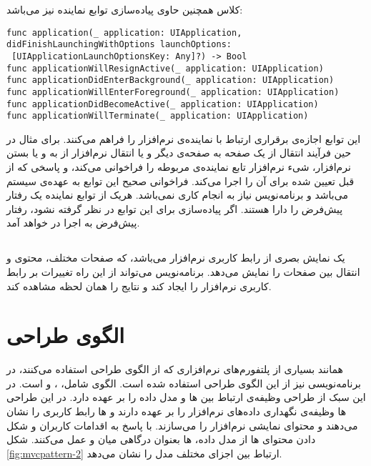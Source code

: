 \documentclass[oneside]{report}
\begin{document}
کلاس
			{\normalsize {}}	
	همچنین حاوی پیاده‌سازی توابع نماینده نیز می‌باشد:
\begin{latin}
	\begin{verbatim}
func application(_ application: UIApplication, 
didFinishLaunchingWithOptions launchOptions:
 [UIApplicationLaunchOptionsKey: Any]?) -> Bool
func applicationWillResignActive(_ application: UIApplication)
func applicationDidEnterBackground(_ application: UIApplication)
func applicationWillEnterForeground(_ application: UIApplication)
func applicationDidBecomeActive(_ application: UIApplication)
func applicationWillTerminate(_ application: UIApplication)
	\end{verbatim}
	
\end{latin}	
این توابع اجازه‌ی برقراری ارتباط با نماینده‌ی نرم‌افزار را فراهم می‌کنند. برای مثال در حین فرآیند انتقال از یک صفحه به صفحه‌ی دیگر و یا انتقال نرم‌افزار از 
			{\normalsize {}}	
			به 
						{\normalsize {}}
و یا بستن نرم‌افزار، شیء نرم‌افزار تابع نماینده‌ی مربوطه را فراخوانی می‌‌کند، و پاسخی که از قبل تعیین شده برای آن را اجرا می‌کند.	فراخوانی صحیح این توابع به عهده‌ی سیستم می‌باشد و برنامه‌نویس نیاز به انجام کاری نمی‌باشد. 					
هریک از توابع نماینده یک رفتار پیش‌فرض را دارا هستند. اگر پیاده‌سازی برای این توابع در نظر گرفته نشود، رفتار پیش‌فرض به اجرا در خواهد آمد. 
\subsection{	{\small {}}}
{\normalsize {}}
یک نمایش بصری از رابط کاربری نرم‌افزار می‌باشد، که صفحات مختلف، محتوی و انتقال بین صفحات را نمایش می‌دهد. 
برنامه‌نویس می‌تواند از این راه تغییرات بر رابط کاربری نرم‌افزار را ایجاد کند و نتایج را همان لحظه مشاهده کند.  	
\section{الگوی طراحی {\small {}}}\label{mvc}
همانند بسیاری از پلتفورم‌های نرم‌افزاری که از الگوی طراحی
{\normalsize {}}
استفاده می‌کنند، در برنامه‌نویسی 
{\normalsize {}}
نیز از این الگوی طراحی استفاده ‌‌شده است. الگوی 
{\normalsize {}}
شامل، 
{\normalsize {}}،
{\normalsize {}} و
{\normalsize {}}
است.  در این سبک از طراحی 
{\normalsize {}} 
وظیفه‌ی ارتباط بین 
{\normalsize {}} ها 
و مدل داده
را بر عهده دارد. در این طراحی 
{\normalsize {}} ها 
وظیفه‌ی نگهداری داده‌های نرم‌افزار را بر عهده دارند و 
{\normalsize {}} ها 
  رابط کاربری را نشان می‌دهند و محتوای نمایشی نرم‌افزار را می‌سازند. با پاسخ به اقدامات کاربران و شکل دادن محتوای 
  {\normalsize {}} 
  ها از مدل داده، 
  {\normalsize {}} 
  ها بعنوان درگاهی میان 
  {\normalsize {}} 
  و 
  {\normalsize {}} 
  عمل می‌کنند. 
  شکل 
  \ref{fig:mvcpattern-2}
  ارتباط بین اجزای مختلف مدل 
  {\normalsize {}}
  را نشان می‌دهد.
  
\end{document}
